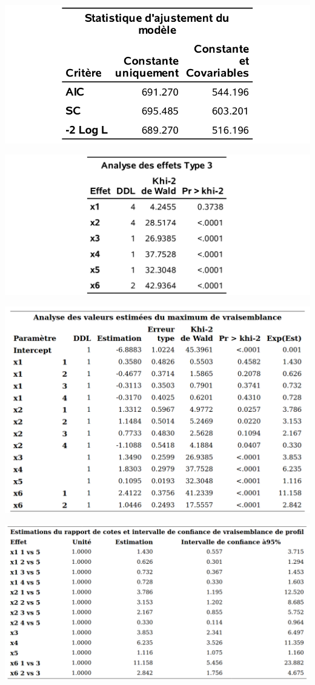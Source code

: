 \documentclass[
  11pt,
  letterpaper,
]{book}
\theoremstyle{definition}
\theoremstyle{definition}
\theoremstyle{definition}
\theoremstyle{definition}
\theoremstyle{remark}
\begin{document}
\begin{center}\includegraphics[width=0.65\linewidth]{figures/03-logistic-e5} \end{center}

\begin{center}\includegraphics[width=0.75\linewidth]{figures/03-logistic-e6} \end{center}

\begin{center}\includegraphics[width=0.9\linewidth]{figures/03-logistic-e7} \end{center}

\begin{center}\includegraphics[width=1\linewidth]{figures/03-logistic-e8} \end{center}
\end{document}
